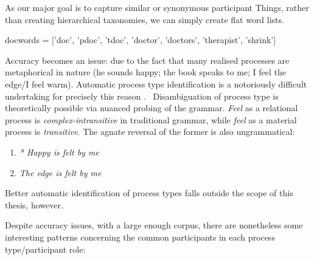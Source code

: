     As our major goal is to capture similar or synonymous participant Things, rather than creating hierarchical taxonomies, we can simply create flat word lists.

    \begin{pyverbatim}
    docwords = ['doc', 'pdoc', 'tdoc', 'doctor', 'doctors', 'therapist', 'shrink']
    \end{pyverbatim}








    Accuracy becomes an issue: due to the fact that many realised processes are metaphorical in nature (he sounds happy; the book speaks to me; I feel the edge\slash I feel warm). Automatic process type identification is a notoriously difficult undertaking for precisely this reason \cite{honnibal_converting_2004,odonnell_uam_2008,costetchi_semantic_2013}.~
    Disambiguation of process type is theoretically possible via nuanced probing of the grammar. \emph{Feel} as a relational process is \emph{complex-intransitive} in traditional grammar, while \emph{feel} as a material process is \emph{transitive}. The agnate reversal of the former is also ungrammatical: %

    \begin{enumerate}
        \item \emph{* Happy is felt by me}
        \item \emph{The edge is felt by me}
    \end{enumerate}

    \noindent Better automatic identification of process types falls outside the scope of this thesis, however.

    Despite accuracy issues, with a large enough corpus, there are nonetheless some interesting patterns concerning the common participants in each process type\slash participant role:

